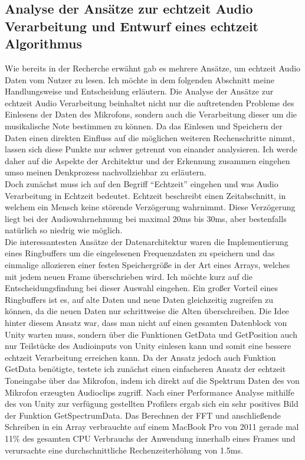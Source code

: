 \subsection{Analyse der Ansätze zur echtzeit Audio Verarbeitung und Entwurf eines echtzeit Algorithmus}
Wie bereits in der Recherche erwähnt gab es mehrere Ansätze, um echtzeit Audio Daten vom Nutzer zu lesen. Ich möchte in dem folgenden Abschnitt
meine Handlungsweise und Entscheidung erläutern. 
Die Analyse der Ansätze zur echtzeit Audio Verarbeitung beinhaltet nicht nur die auftretenden Probleme des Einlesens der Daten des Mikrofons, sondern auch die Verarbeitung dieser um die musikalische Note bestimmen zu können. Da das Einlesen und Speichern der Daten einen direkten Einfluss auf die möglichen weiteren Rechenschritte nimmt, lassen sich diese Punkte nur schwer getrennt von einander analysieren. Ich werde daher auf die Aspekte der Architektur und der Erkennung zusammen eingehen umso meinen Denkprozess nachvollziehbar zu erläutern. \\
Doch zunächst muss ich auf den Begriff ``Echtzeit''  eingehen und was Audio Verarbeitung in Echtzeit bedeutet. Echtzeit beschreibt einen Zeitabschnitt, in welchem ein Mensch keine störende Verzögerung wahrnimmt. Diese Verzögerung liegt bei der Audiowahrnehmung bei maximal 20ms bis 30ms, aber bestenfalls natürlich so niedrig wie möglich. \cite{lago2004quest}\\ %
Die interessantesten Ansätze der Datenarchitektur waren die Implementierung eines Ringbuffers um die eingelesenen Frequenzdaten zu speichern und das einmalige allozieren einer festen Speichergröße in der Art eines Arrays, welches mit jedem neuen Frame überschrieben wird. Ich möchte kurz auf die Entscheidungsfindung bei dieser Auswahl eingehen. Ein großer Vorteil eines Ringbuffers ist es, auf alte Daten und neue Daten gleichzeitig zugreifen zu können, da die neuen Daten nur schrittweise die Alten überschreiben. Die Idee hinter diesem Ansatz war, dass man nicht auf einen gesamten Datenblock von Unity warten muss, sondern über die Funktionen GetData und GetPosition \cite{unity_doku_micro} auch nur Teilstücke des Audioinputs von Unity einlesen kann und somit eine bessere echtzeit Verarbeitung erreichen kann. Da der Ansatz jedoch auch Funktion GetData benötigte, testete ich zunächst einen einfacheren Ansatz der echtzeit Toneingabe über das Mikrofon, indem ich direkt auf die Spektrum Daten des von Mikrofon erzeugten Audioclips zugriff. Nach einer Performance Analyse mithilfe des von Unity zur verfügung gestellten Profilers ergab sich ein sehr positives Bild der Funktion GetSpectrumData. Das Berechnen der FFT und anschließende Schreiben in ein Array verbrauchte auf einem MacBook Pro von 2011 gerade mal 11\% des gesamten CPU Verbrauchs der Anwendung innerhalb eines Frames und verursachte eine durchschnittliche Rechenzeiterhöhung von 1.5ms. 
